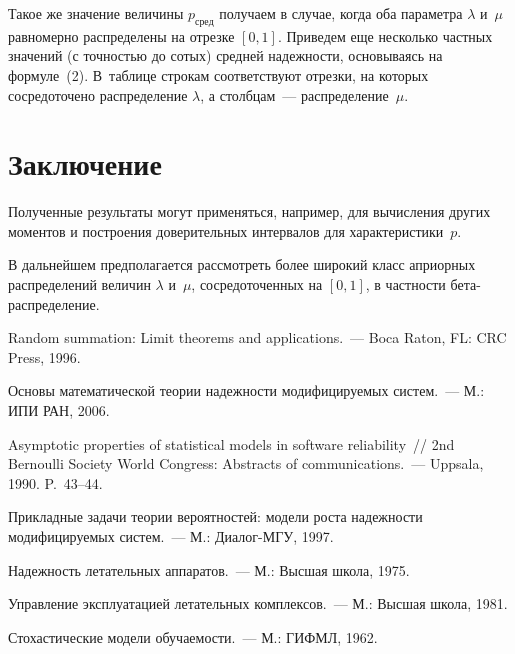 \begin{multicols}{2}

\noindent
Такое же значение величины
$p_{\mathrm{сред}}$ получаем в случае, когда оба па\-ра\-мет\-ра
$\lambda$ и~$\mu$ равномерно распределены на отрезке $[0,1]$.
Приведем еще несколько частных значений (с точ\-ностью до сотых)
средней надежности, основываясь на формуле~(2). В~таб\-ли\-це
строкам соответствуют отрезки, на которых сосредоточено
распределение $\lambda$, а столбцам~--- распределение~$\mu$.



\section{Заключение}

Полученные результаты могут применяться, например, для вычисления
других моментов и построения доверительных интервалов для
характеристики~$p$.

В дальнейшем предполагается рассмотреть более широкий класс
априорных распределений величин $\lambda$ и~$\mu$, сосредоточенных
на $[0,1]$, в частности бе\-та-рас\-пре\-де\-ление.

{\small\frenchspacing
{%
\begin{thebibliography}{99}


 Random summation: Limit
theorems and applications.~--- Boca Raton, FL: CRC Press, 1996.

 Основы математической теории
надежности модифицируемых сис\-тем.~--- М.: ИПИ РАН, 2006.

 Asymptotic properties of statistical models
in software reliability~// 2nd Bernoulli Society World Congress:
Abstracts of communications.~--- Uppsala, 1990. P.~43--44.

 Прикладные задачи теории вероятностей:
модели роста надежности модифицируемых сис\-тем.~--- М.: Диалог-МГУ,
1997.

 Надежность летательных
аппаратов.~--- М.: Высшая школа, 1975.

 Управление эксплуатацией летательных
комплексов.~--- М.: Высшая школа, 1981.

 Стохастические модели обучаемости.~--- М.: ГИФМЛ, 1962.


\end{thebibliography}}}
\end{multicols}
